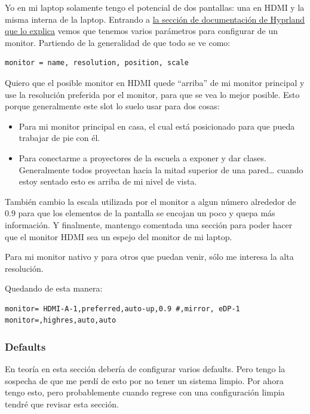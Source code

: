 \documentclass[11pt]{article}
\begin{document}
Yo en mi laptop solamente tengo el potencial de dos pantallas: una en HDMI y la misma interna de la laptop. Entrando a \href{https://wiki.hypr.land/Configuring/Monitors/}{la sección de documentación de Hyprland que lo explica} vemos que tenemos varios parámetros para configurar de un monitor. Partiendo de la generalidad de que todo se ve como:

\begin{verbatim}
monitor = name, resolution, position, scale
\end{verbatim}

Quiero que el posible monitor en HDMI quede ``arriba'' de mi monitor principal y use la resolución preferida por el monitor, para que se vea lo mejor posible. Esto porque generalmente este slot lo suelo usar para dos cosas:

\begin{itemize}
\item Para mi monitor principal en casa, el cual está posicionado para que pueda trabajar de pie con él.
\item Para conectarme a proyectores de la escuela a exponer y dar clases. Generalmente todos proyectan hacia la mitad superior de una pared\ldots{} cuando estoy sentado esto es arriba de mi nivel de vista.
\end{itemize}

También cambio la escala utilizada por el monitor a algun número alrededor de 0.9 para que los elementos de la pantalla se encojan un poco y quepa más información. Y finalmente, mantengo comentada una sección para poder hacer que el monitor HDMI sea un espejo del monitor de mi laptop.

Para mi monitor nativo y para otros que puedan venir, sólo me interesa la alta resolución.

Quedando de esta manera:

\begin{verbatim}
monitor= HDMI-A-1,preferred,auto-up,0.9 #,mirror, eDP-1
monitor=,highres,auto,auto

\end{verbatim}
\subsubsection{Defaults}
\label{sec:org03ed352}

En teoría en esta sección debería de configurar varios defaults. Pero tengo la sospecha de que me perdí de esto por no tener un sistema limpio. Por ahora tengo esto, pero probablemente cuando regrese con una configuración limpia tendré que revisar esta sección.
\end{document}

